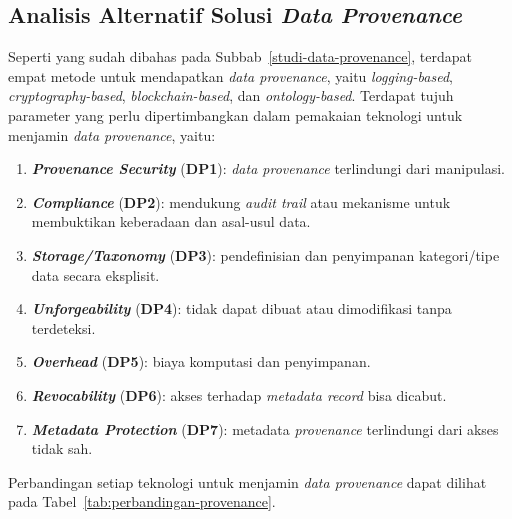 \subsection{Analisis Alternatif Solusi \textit{Data Provenance}}\label{alternatif-provenance}

Seperti yang sudah dibahas pada Subbab~\ref{studi-data-provenance}, terdapat empat metode untuk mendapatkan \textit{data provenance}, yaitu \textit{logging-based}, \textit{cryptography-based}, \textit{blockchain-based}, dan \textit{ontology-based}.
Terdapat tujuh parameter yang perlu dipertimbangkan dalam pemakaian teknologi untuk menjamin \textit{data provenance}, yaitu:

\begin{enumerate}
    \item \textbf{\textit{Provenance Security}} (\textbf{DP1}): \textit{data provenance} terlindungi dari manipulasi.
    \item \textbf{\textit{Compliance}} (\textbf{DP2}): mendukung \textit{audit trail} atau mekanisme untuk membuktikan keberadaan dan asal-usul data.
    \item \textbf{\textit{Storage/Taxonomy}} (\textbf{DP3}): pendefinisian dan penyimpanan kategori/tipe data secara eksplisit.
    \item \textbf{\textit{Unforgeability}} (\textbf{DP4}): tidak dapat dibuat atau dimodifikasi tanpa terdeteksi.
    \item \textbf{\textit{Overhead}} (\textbf{DP5}): biaya komputasi dan penyimpanan.
    \item \textbf{\textit{Revocability}} (\textbf{DP6}): akses terhadap \textit{metadata record} bisa dicabut.
    \item \textbf{\textit{Metadata Protection}} (\textbf{DP7}): metadata \textit{provenance} terlindungi dari akses tidak sah.
\end{enumerate}

Perbandingan setiap teknologi untuk menjamin \textit{data provenance} dapat dilihat pada Tabel~\ref{tab:perbandingan-provenance}.

